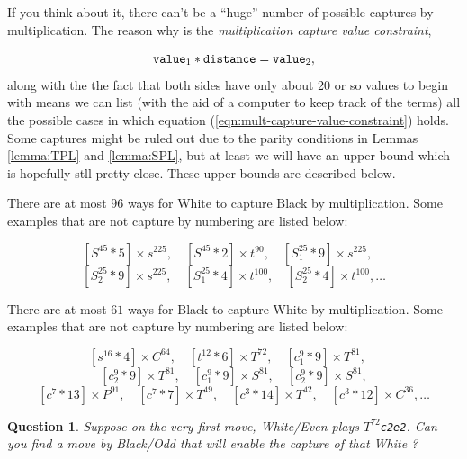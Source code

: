 \documentclass[12pt]{article}
\newtheorem{question}{Question}
\begin{document}

If you think about it, there can't be a ``huge'' number of possible captures by
multiplication. The reason why is the {\it multiplication capture value
constraint},

\begin{equation}
\label{eqn:mult-capture-value-constraint}
{\tt  value}_1*{\tt distance} = {\tt value}_2,
\end{equation}
along with the the fact that both sides have only about 20 or so values
to begin with means we can list (with the aid of a computer to keep track
of the terms) all the possible cases in which
equation (\ref{eqn:mult-capture-value-constraint}) holds.
Some captures might be ruled out due to the parity
conditions in Lemmas \ref{lemma:TPL} and \ref{lemma:SPL},
but at least we will have an upper bound which is hopefully
stll pretty close.
These upper bounds are described below.

There are at most $96$ ways for White to capture Black by multiplication.
Some examples that are not capture by numbering are listed below:

\[
[S^{45}  *  5]  \times  s^{225}, \quad
[S^{45}  *  2]  \times  t^{90}, \quad
[S_1^{25}   *  9]  \times  s^{225}, \quad
\]
\[
[S_2^{25}   *  9]  \times  s^{225}, \quad
[S_1^{25}  *  4]  \times  t^{100}, \quad
[S_2^{25}  *  4]  \times  t^{100}, \dots
\]

There are at most $61$ ways for Black to capture White by multiplication.
Some examples that are not capture by numbering are listed below:

\[
[s^{16}  *  4]  \times  C^{64}, \quad
[t^{12}  *  6]  \times  T^{72},\quad
[c_1^{9}   *  9 ] \times  T^{81}, \quad
\]
\[
[c_2^{9}   *  9 ] \times  T^{81}, \quad
[c_1^{9}   *  9 ] \times  S^{81},\quad
[c_2^{9}   *  9 ] \times  S^{81},
\]
\[
[c^{7}  *  13]  \times  P^{91}, \quad
[c^{7}  *  7 ] \times  T^{49},\quad
[c^{3}  *  14]  \times  T^{42}, \quad
[c^{3}  *  12]  \times  C^{36}, \dots
\]

\begin{question}
Suppose on the very first move, White/Even plays
{\tt $T^{72}$c2e2}. Can you find a move by Black/Odd that will
enable the capture of that White \trianglepa?
\end{question}  
\end{document}
